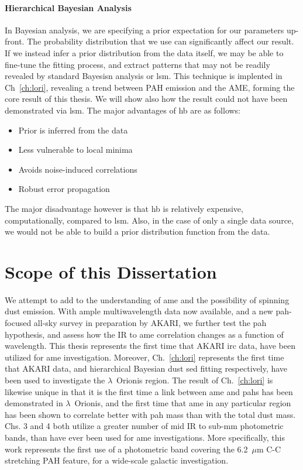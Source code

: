         \paragraph{Hierarchical Bayesian Analysis}
        In Bayesian analysis, we are specifying a prior expectation for our parameters up-front. The probability distribution that we use can significantly affect our result. If we instead infer a prior distribution from the data itself, we may be able to fine-tune the fitting process, and extract patterns that may not be readily revealed by standard Bayesisn analysis or \acrshort{lsm}. This technique is implented in Ch~\ref{ch:lori}, revealing a trend between PAH emission and the AME, forming the core result of this thesis. We will show also how the result could not have been demonstrated via \acrshort{lsm}. The major advantages of \acrshort{hb} are as follows:
            \begin{itemize}
              \setlength{\itemsep}{5pt}
                \item Prior is inferred from the data
                \item Less vulnerable to local minima
                \item Avoids noise-induced correlations
                \item Robust error propagation
            \end{itemize}
        The major disadvantage however is that \acrshort{hb} is relatively expensive, computationally, compared to \acrshort{lsm}. Also, in the case of only a single data source, we would not be able to build a prior distribution function from the data.

\section{Scope of this Dissertation}
    We attempt to add to the understanding of \acrshort{ame} and the possibility of spinning dust emission. With ample multiwavelength data now available, and a new \acrshort{pah}-focused all-sky survey in preparation by AKARI, we further test the \acrshort{pah} hypothesis, and assess how the IR to \acrshort{ame} correlation changes as a function of wavelength. This thesis represents the first time that AKARI \acrshort{irc} data, have been utilized for \acrshort{ame} investigation. Moreover, Ch.~\ref{ch:lori} represents the first time that AKARI data, and hierarchical Bayesian dust \acrshort{sed} fitting respectively, have been used to investigate the $\lambda$~Orionis region. The result of Ch.~\ref{ch:lori} is likewise unique in that it is the first time a link between \acrshort{ame} and \acrshort{pah}s has been demonstrated in $\lambda$~Orionis, and the first time that \acrshort{ame} in any particular region has been shown to correlate better with \acrshort{pah} mass than with the total dust mass. Chs. 3 and 4 both utilize a greater number of mid IR to sub-mm photometric bands, than have ever been used for \acrshort{ame} investigations. More specifically, this work represents the first use of a  photometric band covering the 6.2~$\mu$m C-C stretching PAH feature, for a wide-scale galactic investigation.

